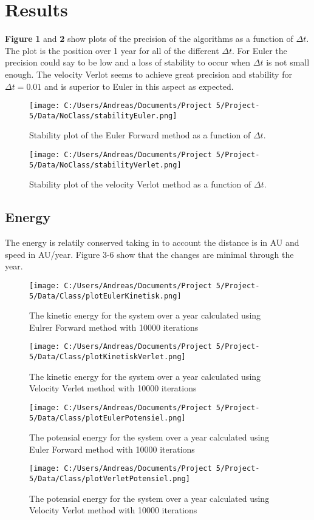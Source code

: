 \documentclass[twoside,twocolumn]{article}
\begin{document}
\section{Results}
\textbf{Figure} \textbf{1} and \textbf{2} show plots of the precision of the algorithms as a function of $\Delta t$. The plot is the position over 1 year for all of the different $\Delta t$. For Euler the precision could say to be low and a loss of stability to occur when $\Delta t$ is not small enough. The velocity Verlot seems to achieve great precision and stability for $\Delta t = 0.01$ and is superior to Euler in this aspect as expected.
 
\begin{figure}[H]  \texttt{[image: C:/Users/Andreas/Documents/Project 5/Project-5/Data/NoClass/stabilityEuler.png]}
  \caption{Stability plot of the Euler Forward method as a function of $\Delta t$.}
  \label{fig:boat1}
\end{figure}
\begin{figure}[H]  \texttt{[image: C:/Users/Andreas/Documents/Project 5/Project-5/Data/NoClass/stabilityVerlet.png]}
  \caption{Stability plot of the velocity Verlot method as a function of $\Delta t$.}
  \label{fig:boat2}
\end{figure}

\subsection{Energy}

The energy is relatily conserved taking in to account the distance is in AU and speed in AU/year. Figure 3-6 show that the changes are minimal through the year.
\begin{figure}[H]  \texttt{[image: C:/Users/Andreas/Documents/Project 5/Project-5/Data/Class/plotEulerKinetisk.png]}
  \caption{The kinetic energy for the system over a year calculated using Eulrer Forward method with 10000 iterations}
  \label{fig:boat2}
\end{figure}
\begin{figure}[H]  \texttt{[image: C:/Users/Andreas/Documents/Project 5/Project-5/Data/Class/plotKinetiskVerlet.png]}
  \caption{The kinetic energy for the system over a year calculated using Velocity Verlet method with 10000 iterations}
  \label{fig:boat2}
\end{figure}
\begin{figure}[H]  \texttt{[image: C:/Users/Andreas/Documents/Project 5/Project-5/Data/Class/plotEulerPotensiel.png]}
  \caption{The potensial energy for the system over a year calculated using Euler Forward method with 10000 iterations}
  \label{fig:boat2}
\end{figure}
\begin{figure}[H]  \texttt{[image: C:/Users/Andreas/Documents/Project 5/Project-5/Data/Class/plotVerletPotensiel.png]}
  \caption{The potensial energy for the system over a year calculated using Velocity Verlot method with 10000 iterations}
  \label{fig:boat2}
\end{figure}
\end{document}
